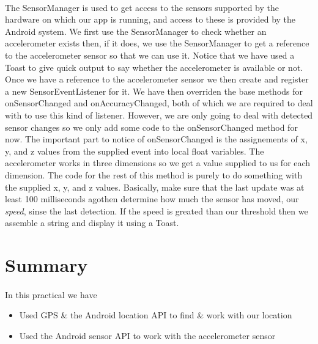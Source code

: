 \paragraph{} The SensorManager is used to get access to the sensors supported by the hardware on which our app is running, and access to these is provided by the Android system. We first use the SensorManager to check whether an accelerometer exists then, if it does, we use the SensorManager to get a reference to the accelerometer sensor so that we can use it. Notice that we have used a Toast to give quick output to say whether the accelerometer is available or not. Once we have a reference to the accelerometer sensor we then create and register a new SensorEventListener for it. We have then overriden the base methods for onSensorChanged and onAccuracyChanged, both of which we are required to deal with to use this kind of listener. However, we are only going to deal with detected sensor changes so we only add some code to the onSensorChanged method for now. The important part to notice of onSensorChanged is the assignements of x, y, and z values from the supplied event into local float variables. The accelerometer works in three dimensions so we get a value supplied to us for each dimension. The code for the rest of this method is purely to do something with the supplied x, y, and z values. Basically, make sure that the last update was at least 100 milliseconds agothen determine how much the sensor has moved, our {\emph{speed}}, sinse the last detection. If the  speed is greated than our threshold then we assemble a string and display it using a Toast.

\section{Summary}
\paragraph{} In this practical we have 

\begin{itemize}
\item Used GPS \& the Android location API to find \& work with our location
\item Used the Android sensor API to work with the accelerometer sensor
\end{itemize}


